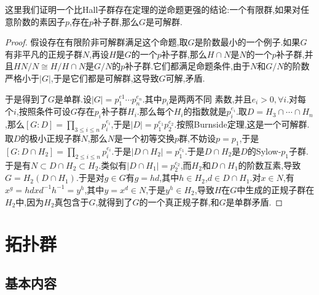 这里我们证明一个比Hall子群存在定理的逆命题更强的结论:一个有限群,如果对任意阶数的素因子$p$,存在$p$补子群,那么$G$是可解群.
\begin{proof}
	
	假设存在有限阶非可解群满足这个命题,取$G$是阶数最小的一个例子.如果$G$有非平凡的正规子群$N$,再设$H$是$G$的一个$p$补子群,那么$H\cap N$是$N$的一个$p$补子群,并且$HN/N\cong H/H\cap N$是$G/N$的$p$补子群.它们都满足命题条件,由于$N$和$G/N$的阶数严格小于$|G|$,于是它们都是可解群,这导致$G$可解,矛盾.
	
	于是得到了$G$是单群.设$|G|=p_1^{e1}\cdots p_n^{e_n}$.其中$p_i$是两两不同 素数,并且$e_i>0,\forall i$.对每个$i$,按照条件可设$G$存在$p_i$补子群$H_i$.那么每个$H_i$的指数就是$p_i^{e_i}$.取$D=H_3\cap\cdots\cap H_n$,那么$[G:D]=\prod_{3\le i\le n}p_i^{e_i}$,于是$|D|=p_1^{e_1}p_2^{e_2}$.按照Burnside定理,这是一个可解群.取$D$的极小正规子群$N$,那么$N$是一个初等交换$p$群,不妨设$p=p_1$,于是$[G:D\cap H_2]=\prod_{2\le i\le n}p_i^{e_i}$.于是$|D\cap H_2|=p_1^{e_1}$.于是$D\cap H_2$是$D$的Sylow-$p_1$子群.于是有$N\subset D\cap H_2\subset H_2$.类似有$|D\cap H_1|=p_2^{e_2}$,而$H_2$和$D\cap H_1$的阶数互素,导致$G=H_2(D\cap H_1)$.于是对$g\in G$有$g=hd$,其中$h\in H_2$,$d\in D\cap H_1$.对$x\in N$,有$x^g=hdxd^{-1}h^{-1}=y^h$,其中$y=x^d\in N$,于是$y^h\in H_2$,导致$H$在$G$中生成的正规子群在$H_2$中,因为$H_2$真包含于$G$,就得到了$G$的一个真正规子群,和$G$是单群矛盾.
\end{proof}
\newpage
\section{拓扑群}
\subsection{基本内容}


